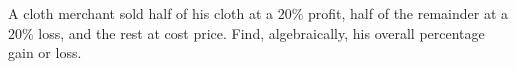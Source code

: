 A cloth merchant sold half of his cloth at a $20\%$ profit, half of the remainder at a $20\%$ loss, and the rest at cost price. Find, algebraically, his overall percentage gain or loss.
